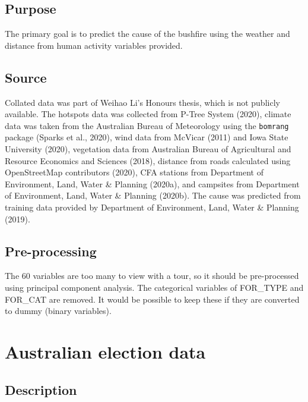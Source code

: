 \documentclass[
  letterpaper,
]{book}
\begin{document}
\hypertarget{purpose-1}{%
\subsection*{Purpose}\label{purpose-1}}

The primary goal is to predict the cause of the bushfire using the
weather and distance from human activity variables provided.

\hypertarget{source-1}{%
\subsection*{Source}\label{source-1}}

Collated data was part of Weihao Li's Honours thesis, which is not
publicly available. The hotspots data was collected from P-Tree System
(2020), climate data was taken from the Australian Bureau of Meteorology
using the \texttt{bomrang} package (Sparks et al., 2020), wind data from
McVicar (2011) and Iowa State University (2020), vegetation data from
Australian Bureau of Agricultural and Resource Economics and Sciences
(2018), distance from roads calculated using OpenStreetMap contributors
(2020), CFA stations from Department of Environment, Land, Water \&
Planning (2020a), and campsites from Department of Environment, Land,
Water \& Planning (2020b). The cause was predicted from training data
provided by Department of Environment, Land, Water \& Planning (2019).

\hypertarget{pre-processing-1}{%
\subsection*{Pre-processing}\label{pre-processing-1}}

The 60 variables are too many to view with a tour, so it should be
pre-processed using principal component analysis. The categorical
variables of FOR\_TYPE and FOR\_CAT are removed. It would be possible to
keep these if they are converted to dummy (binary variables).

\hypertarget{australian-election-data}{%
\section{Australian election data}\label{australian-election-data}}

\hypertarget{description-2}{%
\subsection*{Description}\label{description-2}}
\end{document}
